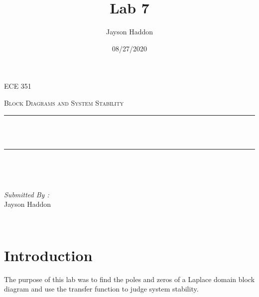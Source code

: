 \documentclass[11pt,a4]{report}
\title{Lab 7}
\author{Jayson Haddon}
\date{08/27/2020}
\makeatletter
\let\thetitle\@title
\makeatother
\begin{document}

\begin{titlepage}
	\centering
    \vspace*{0.5 cm}
\begin{center}    \textsc{\Large   ECE 351 }\\[2.0 cm]	\end{center}%
	\textsc{\Large Block Diagrams and System Stability  }\\[0.5 cm]				%
	\rule{\linewidth}{0.2 mm} \\[0.4 cm]
	{ \huge \bfseries \thetitle}\\
	\rule{\linewidth}{0.2 mm} \\[1.5 cm]
	
	\begin{minipage}{0.4\textwidth}
		\begin{flushleft} \large
			\end{flushleft}
			\end{minipage}~
			\begin{minipage}{0.4\textwidth}
            
			\begin{flushright} \large
			\emph{Submitted By :} \\
			Jayson Haddon  
		\end{flushright}
           
	\end{minipage}\\[2 cm]
	
    
    
    
    
	
\end{titlepage}

\tableofcontents
\pagebreak

\renewcommand{\thesection}{\arabic{section}}
\section{Introduction}
The purpose of this lab was to find the poles and zeros of a Laplace domain block diagram and use the transfer function to judge system stability.
\end{document}
